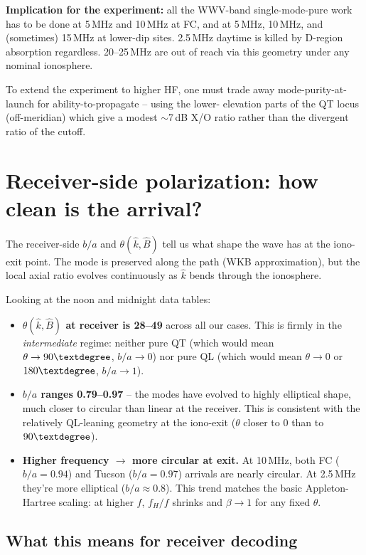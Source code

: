 \documentclass[11pt]{article}
\begin{document}
\textbf{Implication for the experiment:} all the WWV-band
single-mode-pure work has to be done at 5\,MHz and 10\,MHz at FC, and
at 5\,MHz, 10\,MHz, and (sometimes) 15\,MHz at lower-dip sites.
2.5\,MHz daytime is killed by D-region absorption regardless.
20--25\,MHz are out of reach via this geometry under any nominal
ionosphere.

To extend the experiment to higher HF, one must trade away
mode-purity-at-launch for ability-to-propagate -- using the lower-
elevation parts of the QT locus (off-meridian) which give a modest
$\sim$7\,dB X/O ratio rather than the divergent ratio of the cutoff.


\section{Receiver-side polarization: how clean is the arrival?}

The receiver-side $b/a$ and $\theta(\hat k,\hat B)$ tell us what
shape the wave has at the iono-exit point.  The mode is preserved
along the path (WKB approximation), but the local axial ratio
evolves continuously as $\hat{k}$ bends through the ionosphere.

Looking at the noon and midnight data tables:

\begin{itemize}
\item \textbf{$\theta(\hat k,\hat B)$ at receiver is 28--49\textdegree}
across all our cases.  This is firmly in the \emph{intermediate}
regime: neither pure QT (which would mean $\theta\to 90\textdegree$,
$b/a\to 0$) nor pure QL (which would mean $\theta\to 0$ or
$180\textdegree$, $b/a\to 1$).
\item \textbf{$b/a$ ranges 0.79--0.97} -- the modes have evolved to
  highly elliptical shape, much closer to circular than linear at
  the receiver.  This is consistent with the relatively QL-leaning
  geometry at the iono-exit ($\theta$ closer to $0$ than to
  $90\textdegree$).
\item \textbf{Higher frequency $\to$ more circular at exit.}  At
  10\,MHz, both FC ($b/a=0.94$) and Tucson ($b/a=0.97$) arrivals
  are nearly circular.  At 2.5\,MHz they're more elliptical
  ($b/a\approx 0.8$).  This trend matches the basic Appleton-Hartree
  scaling: at higher $f$, $f_H/f$ shrinks and $\beta\to 1$ for any
  fixed $\theta$.
\end{itemize}

\subsection*{What this means for receiver decoding}
\end{document}
